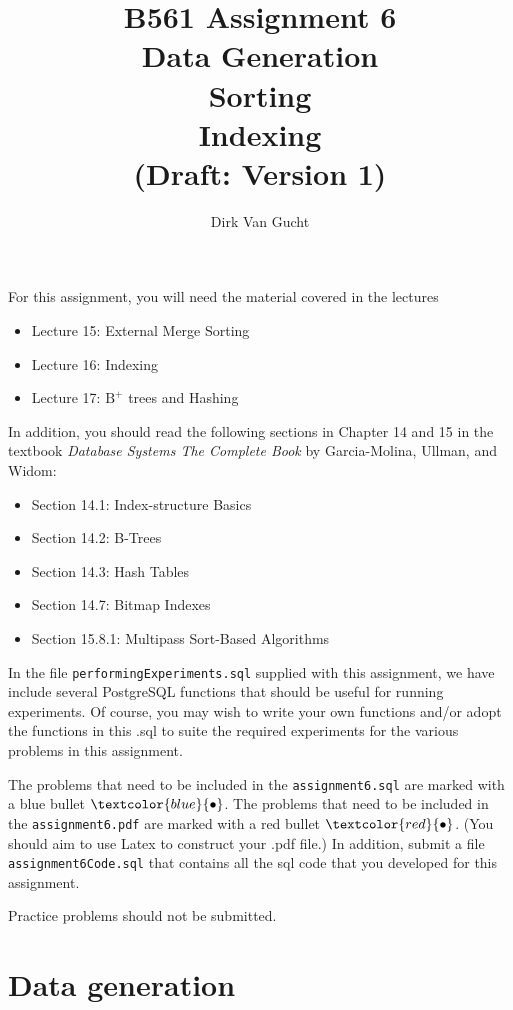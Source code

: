 \documentclass{article}
\newcommand{\redbullet}{$\textcolor{red}{\bullet}$}
\newcommand{\bluebullet}{$\textcolor{blue}{\bullet}$}
\begin{document}
\title{B561 Assignment 6\\
Data Generation \\Sorting \\ Indexing \\ (Draft: Version 1)}
\author{Dirk Van Gucht}
\date{}
\maketitle

For this assignment, you will need the material covered in the lectures
\begin{itemize}
\item Lecture 15: External Merge Sorting
\item Lecture 16: Indexing
\item Lecture 17: $\text{B}^+$ trees and Hashing
\end{itemize} 
In addition, you should read the following sections in Chapter 14 and 15 in the textbook \emph{Database Systems The Complete Book} by Garcia-Molina, Ullman, and Widom:
\begin{itemize}
\item Section 14.1: Index-structure Basics
\item Section 14.2: B-Trees
\item Section 14.3: Hash Tables
\item Section 14.7: Bitmap Indexes
\item Section 15.8.1: Multipass Sort-Based Algorithms
\end{itemize} 

In the file {\tt performingExperiments.sql} supplied with this assignment, we have include several
PostgreSQL functions that should be useful for running experiments.     Of course, you may wish to write your own functions and/or adopt the functions in this .sql to suite the required experiments for the various problems in this assignment.

The problems that need to be included in the {\tt assignment6.sql} are marked with a blue bullet \bluebullet.
The problems that need to be included in the {\tt assignment6.pdf} are marked with a red bullet \redbullet.
(You should aim to use Latex to construct your .pdf file.)
In addition, submit a file {\tt assignment6Code.sql} that contains all the sql code that you developed for this assignment.

Practice problems should not be submitted.


\newpage
\section{Data generation}
\end{document}
